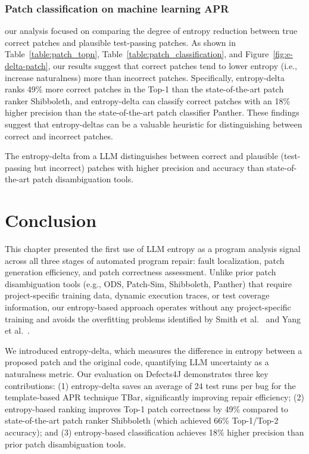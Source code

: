 \documentclass[12pt,openany,oneside,table]{cmuthesis}
\begin{document}
\subsubsection{Patch classification on machine learning APR}
our analysis focused on comparing the degree of entropy reduction between true
correct patches and plausible test-passing patches. As shown in
Table~\ref{table:patch_topn}, Table~\ref{table:patch_classification}, and
Figure~\ref{fig:e-delta-patch}, our results suggest that correct patches
tend to lower entropy (i.e., increase naturalness) more than incorrect patches. 
Specifically, entropy-delta ranks 49\% more correct patches in the Top-1
than the state-of-the-art patch ranker Shibboleth, and entropy-delta can
classify correct patches with an 18\% higher precision than the state-of-the-art
patch classifier Panther. These findings suggest that entropy-deltas can be a
valuable heuristic for distinguishing between correct and incorrect patches.


\begin{tcolorbox}
  [colback=white,colframe=black,arc=0pt,boxrule=0.5pt,title=RQ2
    Summary,boxsep=2pt,left=1pt,right=1pt,top=1pt,bottom=1pt,fonttitle=\bfseries]
    The entropy-delta from a LLM distinguishes between correct and plausible
    (test-passing but incorrect) patches with
    higher precision and accuracy than state-of-the-art patch disambiguation tools.
\end{tcolorbox}


\section{Conclusion}
\label{sec:Entropy-conclusion}
This chapter presented the first use of LLM entropy as a program analysis signal across all three stages of automated program repair: fault localization, patch generation efficiency, and patch correctness assessment. Unlike prior patch disambiguation tools (e.g., ODS, Patch-Sim, Shibboleth, Panther) that require project-specific training data, dynamic execution traces, or test coverage information, our entropy-based approach operates without any project-specific training and avoids the overfitting problems identified by Smith et al.~\cite{CURE} and Yang et al.~\cite{yang2023large}.

We introduced entropy-delta, which measures the difference in entropy between a proposed patch and the original code, quantifying LLM uncertainty as a naturalness metric. Our evaluation on Defects4J demonstrates three key contributions: (1) entropy-delta saves an average of 24 test runs per bug for the template-based APR technique TBar, significantly improving repair efficiency; (2) entropy-based ranking improves Top-1 patch correctness by 49\% compared to state-of-the-art patch ranker Shibboleth (which achieved 66\% Top-1/Top-2 accuracy); and (3) entropy-based classification achieves 18\% higher precision than prior patch disambiguation tools.
\end{document}
